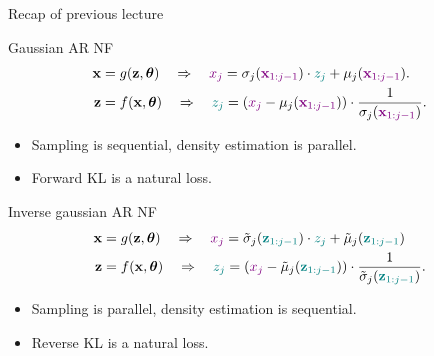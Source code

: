 

\begin{frame}
\titlepage
\end{frame}
\begin{frame}{Recap of previous lecture}
	\begin{block}{Gaussian AR NF}
		\vspace{-0.6cm}
		\begin{align*}
			\mathbf{x} &= g(\mathbf{z}, \boldsymbol{\theta}) \quad \Rightarrow \quad {\color{violet}x_j} = \sigma_j ({\color{violet}\mathbf{x}_{1:j-1}}) \cdot {\color{teal} z_j} + \mu_j({\color{violet}\mathbf{x}_{1:j-1}}). \\
			\mathbf{z} &= f(\mathbf{x}, \boldsymbol{\theta}) \quad \Rightarrow \quad {\color{teal} z_j} = \left({\color{violet} x_j} - \mu_j({\color{violet}\mathbf{x}_{1:j-1}}) \right) \cdot \frac{1}{\sigma_j ({\color{violet} \mathbf{x}_{1:j-1}}) }.
		\end{align*}
		\vspace{-0.6cm}
		\begin{itemize}
			\item Sampling is sequential, density estimation is parallel.
			\item Forward KL is a natural loss.
		\end{itemize}
	\end{block}
	\begin{block}{Inverse gaussian AR NF}
		\vspace{-0.6cm}
		\begin{align*}
			\mathbf{x} &= g(\mathbf{z}, \boldsymbol{\theta}) \quad \Rightarrow \quad {\color{violet} x_j} = \tilde{\sigma}_j ({\color{teal}\mathbf{z}_{1:j-1}}) \cdot {\color{teal} z_j} + \tilde{\mu}_j({\color{teal}\mathbf{z}_{1:j-1}}) \\
			\mathbf{z} &= f(\mathbf{x}, \boldsymbol{\theta}) \quad \Rightarrow \quad {\color{teal}z_j} = \left( {\color{violet} x_j} - \tilde{\mu}_j({\color{teal}\mathbf{z}_{1:j-1}})\right) \cdot \frac{1}{\tilde{\sigma}_j ({\color{teal}\mathbf{z}_{1:j-1}}) }.
		\end{align*}
		\vspace{-0.6cm}
		\begin{itemize}
			\item Sampling is parallel, density estimation is sequential.
			\item Reverse KL is a natural loss.
		\end{itemize}
	\end{block}
\end{frame}
